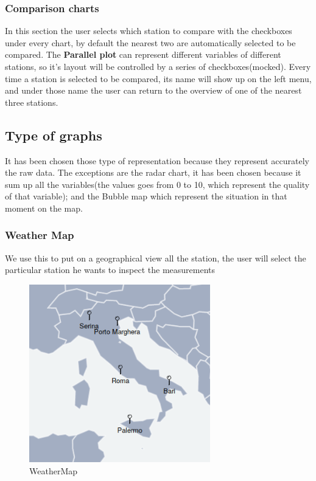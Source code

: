 \documentclass[12pt]{article} %
\begin{document}
\subsubsection{Comparison charts}
In this section the user selects which station to compare with the checkboxes under every chart, by default the nearest two are automatically selected to be compared.
The \textbf{Parallel plot} can represent different variables of different stations, so it's layout will be controlled by a series of checkboxes(mocked).
Every time a station is selected to be compared, its name will show up on the left menu, and under those name the user can return to the overview of one of the nearest three stations.     

\subsection{Type of graphs}
It has been chosen those type of representation because they represent accurately the raw data. The exceptions are the radar chart, it has been chosen because it sum up all the variables(the values goes from 0 to 10, which represent the quality of that variable); and the Bubble map which represent the situation in that moment on the map.

\subsubsection{Weather Map}
We use this to put on a geographical view all the station, the user will select the particular station he wants to inspect the measurements
\begin{figure}[H]
  \centering
  \includegraphics[width=0.7\textwidth]{img/WeatherMap.png}
  \caption{WeatherMap}
  \label{fig:rdrChart}
\end{figure}
\end{document}
